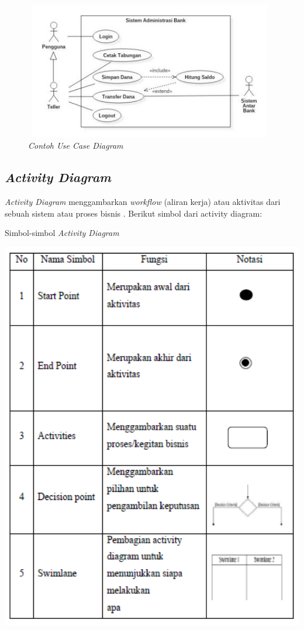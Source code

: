 \begin{figure}[H]
	\centering
	\includegraphics[width=11cm,height=6cm]{gambar/contohusecase}
	\caption{\textit{Contoh \textit{Use Case Diagram}}}
	\label{contoh_usecase}
\end{figure}

\subsection{\emph{Activity Diagram}} 

\emph{Activity Diagram} menggambarkan \textit{workflow} (aliran kerja) atau aktivitas dari sebuah sistem atau proses bisnis \cite{AdeHendini}. Berikut simbol dari activity diagram:

\begin{table}[H]
	\centering
	\caption{Simbol-simbol \emph{Activity Diagram} \cite{AdeHendini}}
	\includegraphics[width=1.0\textwidth]{gambar/simbolactivity}
	\label{tabel_karaktermax2}
\end{table}

